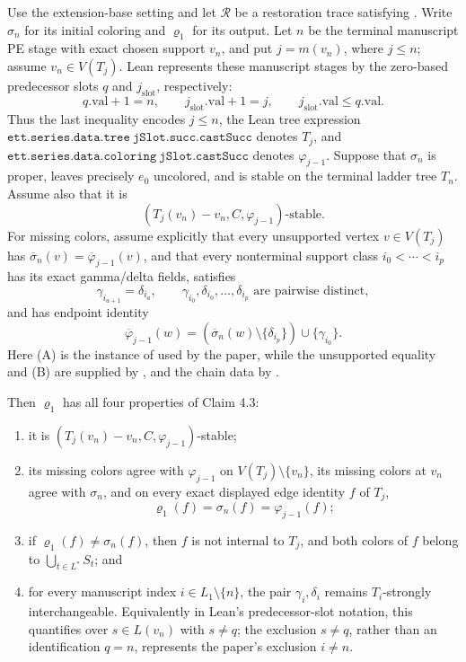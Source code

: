 \begin{lemma}
Use the extension-base setting and let
\(\mathcal R\) be a restoration trace satisfying
.  Write
\(\sigma_n\) for its initial coloring and \(\varrho_1\) for its output.
Let \(n\) be the terminal manuscript PE stage with exact chosen support
\(v_n\), and put \(j=m(v_n)\), where \(j\leq n\); assume
\(v_n\in V(T_j)\).  Lean represents these manuscript stages by the
zero-based predecessor slots \(q\) and \(j_{\mathrm{slot}}\), respectively:
\[
 q.\mathrm{val}+1=n,\qquad j_{\mathrm{slot}}.\mathrm{val}+1=j,
 \qquad j_{\mathrm{slot}}.\mathrm{val}\leq q.\mathrm{val}.
\]
Thus the last inequality encodes \(j\leq n\), the Lean tree expression
\(\mathtt{ett.series.data.tree\ jSlot.succ.castSucc}\) denotes \(T_j\),
and \(\mathtt{ett.series.data.coloring\ jSlot.castSucc}\) denotes
\(\varphi_{j-1}\).  Suppose that \(\sigma_n\) is proper, leaves precisely
\(e_0\) uncolored, and is stable on the terminal ladder tree \(T_n\).
Assume also that it is
\[
 (T_j(v_n)-v_n,C,\varphi_{j-1})\text{-stable}.                \tag{A}
\]
For missing colors, assume explicitly that every unsupported vertex
\(v\in V(T_j)\) has
\(\overline{\sigma}_n(v)=\overline{\varphi}_{j-1}(v)\), and that every
nonterminal support class \(i_0<\cdots<i_p\) has its exact gamma/delta
fields, satisfies
\[
 \gamma_{i_{a+1}}=\delta_{i_a},
 \qquad
 \gamma_{i_0},\delta_{i_0},\ldots,\delta_{i_p}
 \text{ are pairwise distinct},
\]
and has endpoint identity
\[
 \overline{\varphi}_{j-1}(w)
  =(\overline{\sigma}_n(w)\setminus\{\delta_{i_p}\})
      \cup\{\gamma_{i_0}\}.                                  \tag{B}
\]
Here (A) is the instance of  used by the paper,
while the unsupported equality and (B) are supplied by
, and the chain data by
.

Then \(\varrho_1\) has all four properties of Claim 4.3:
\begin{enumerate}
\item[(b1)] it is
 \((T_j(v_n)-v_n,C,\varphi_{j-1})\)-stable;
\item[(b2)] its missing colors agree with
 \(\varphi_{j-1}\) on \(V(T_j)\setminus\{v_n\}\), its missing colors at
 \(v_n\) agree with \(\sigma_n\), and on every exact displayed edge
 identity \(f\) of \(T_j\),
 \[
                  \varrho_1(f)=\sigma_n(f)=\varphi_{j-1}(f);
 \]
\item[(b3)] if \(\varrho_1(f)\ne\sigma_n(f)\), then \(f\) is not
 internal to \(T_j\), and both colors of \(f\) belong to
 \(\bigcup_{t\in L^*}S_t\); and
\item[(b4)] for every manuscript index \(i\in L_1\setminus\{n\}\),
 the pair \(\gamma_i,\delta_i\) remains \(T_i\)-strongly
 interchangeable.  Equivalently in Lean's predecessor-slot notation,
 this quantifies over \(s\in L(v_n)\) with \(s\ne q\); the exclusion
 \(s\ne q\), rather than an identification \(q=n\), represents the
 paper's exclusion \(i\ne n\).
\end{enumerate}
\end{lemma}
